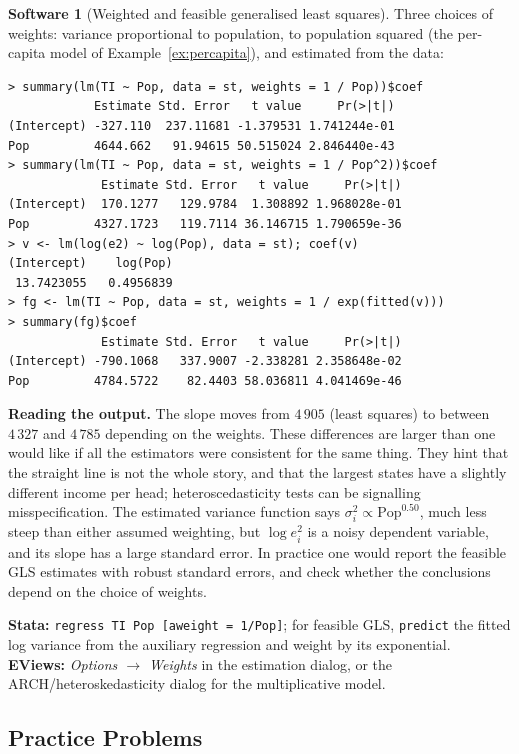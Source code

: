 \documentclass[11pt,a4paper]{article}
\numberwithin{equation}{section}
\theoremstyle{definition}
\newtheorem{software}[thm]{Software}
\begin{document}
\begin{software}[Weighted and feasible generalised least squares]
\label{sw:wls}
Three choices of weights: variance proportional to population, to population squared (the per-capita model of Example~\ref{ex:percapita}), and estimated
from the data:
{\small\begin{verbatim}
> summary(lm(TI ~ Pop, data = st, weights = 1 / Pop))$coef
            Estimate Std. Error   t value     Pr(>|t|)
(Intercept) -327.110  237.11681 -1.379531 1.741244e-01
Pop         4644.662   91.94615 50.515024 2.846440e-43
> summary(lm(TI ~ Pop, data = st, weights = 1 / Pop^2))$coef
             Estimate Std. Error   t value     Pr(>|t|)
(Intercept)  170.1277   129.9784  1.308892 1.968028e-01
Pop         4327.1723   119.7114 36.146715 1.790659e-36
> v <- lm(log(e2) ~ log(Pop), data = st); coef(v)
(Intercept)    log(Pop)
 13.7423055   0.4956839
> fg <- lm(TI ~ Pop, data = st, weights = 1 / exp(fitted(v)))
> summary(fg)$coef
             Estimate Std. Error   t value     Pr(>|t|)
(Intercept) -790.1068   337.9007 -2.338281 2.358648e-02
Pop         4784.5722    82.4403 58.036811 4.041469e-46
\end{verbatim}}
\textbf{Reading the output.} The slope moves from $4\,905$ (least squares) to between $4\,327$ and $4\,785$ depending on the weights. These differences are
larger than one would like if all the estimators were consistent for the same thing. They hint that the straight line is not the whole story, and that
the largest states have a slightly different income per head; heteroscedasticity tests can be signalling misspecification. The estimated variance
function says $\sigma_i^2 \propto \text{Pop}^{0.50}$, much less steep than either assumed weighting, but $\log e_i^2$ is a noisy dependent variable, and its slope has a large
standard error. In practice one would report the feasible GLS estimates with robust standard errors, and check whether the conclusions depend on the
choice of weights.

\textbf{Stata:} \texttt{regress TI Pop [aweight = 1/Pop]}; for feasible GLS, \texttt{predict} the fitted log variance from the auxiliary regression and weight by
its exponential. \textbf{EViews:} \emph{Options $\to$ Weights} in the estimation dialog, or the ARCH/heteroskedasticity dialog for the multiplicative model.
\end{software}

\subsection{Practice Problems}
\end{document}
